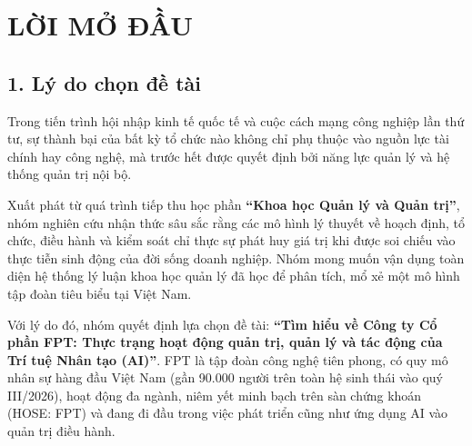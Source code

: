 \section*{LỜI MỞ ĐẦU}

\subsection*{1. Lý do chọn đề tài}
Trong tiến trình hội nhập kinh tế quốc tế và cuộc cách mạng công nghiệp lần thứ tư, sự thành bại của bất kỳ tổ chức nào không chỉ phụ thuộc vào nguồn lực tài chính hay công nghệ, mà trước hết được quyết định bởi năng lực quản lý và hệ thống quản trị nội bộ. 

Xuất phát từ quá trình tiếp thu học phần \textbf{``Khoa học Quản lý và Quản trị''}, nhóm nghiên cứu nhận thức sâu sắc rằng các mô hình lý thuyết về hoạch định, tổ chức, điều hành và kiểm soát chỉ thực sự phát huy giá trị khi được soi chiếu vào thực tiễn sinh động của đời sống doanh nghiệp. Nhóm mong muốn vận dụng toàn diện hệ thống lý luận khoa học quản lý đã học để phân tích, mổ xẻ một mô hình tập đoàn tiêu biểu tại Việt Nam.

Với lý do đó, nhóm quyết định lựa chọn đề tài: \textbf{``Tìm hiểu về Công ty Cổ phần FPT: Thực trạng hoạt động quản trị, quản lý và tác động của Trí tuệ Nhân tạo (AI)''}. FPT là tập đoàn công nghệ tiên phong, có quy mô nhân sự hàng đầu Việt Nam (gần 90.000 người trên toàn hệ sinh thái vào quý III/2026), hoạt động đa ngành, niêm yết minh bạch trên sàn chứng khoán (HOSE: FPT) và đang đi đầu trong việc phát triển cũng như ứng dụng AI vào quản trị điều hành.

